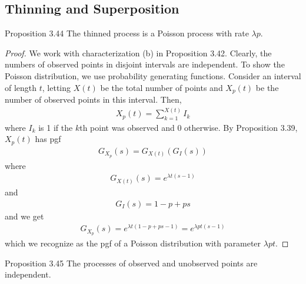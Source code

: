 \subsection{Thinning and Superposition}
%

\begin{boks}{Proposition 3.44}
  The thinned process is a Poisson process with rate $\lambda p$.
\end{boks}

\begin{proof}
  We work with characterization (b) in Proposition 3.42. Clearly, the numbers of observed points in disjoint intervals are independent.
  To show the Poisson distribution, we use probability generating functions.
  Consider an interval of length $t$, letting $X(t)$ be the total number of points and $X_p(t)$ be the number of observed points in this interval.
  Then,
  \begin{align*}
    X_p(t) = \sum_{k = 1}^{X(t)} I_k
  \end{align*}
  where $I_k$ is 1 if the $k$th point was observed and 0 otherwise. By Proposition 3.39, $X_p(t)$ has pgf
  \begin{align*}
    G_{X_p}(s) = G_{X(t)}(G_{I}(s))
  \end{align*}
  where
  \begin{align*}
    G_{X(t)}(s) = e^{\lambda t (s - 1)}
  \end{align*}
  and
  \begin{align*}
    G_I(s) = 1 - p + ps
  \end{align*}
  and we get
  \begin{align*}
    G_{X_p}(s) = e^{\lambda t(1 - p + ps - 1)} = e^{\lambda pt(s - 1)}
  \end{align*}
  which we recognize as the pgf of a Poisson distribution with parameter $\lambda pt$.
\end{proof}

\begin{boks}{Proposition 3.45}
  The processes of observed and unobserved points are independent.
\end{boks}

